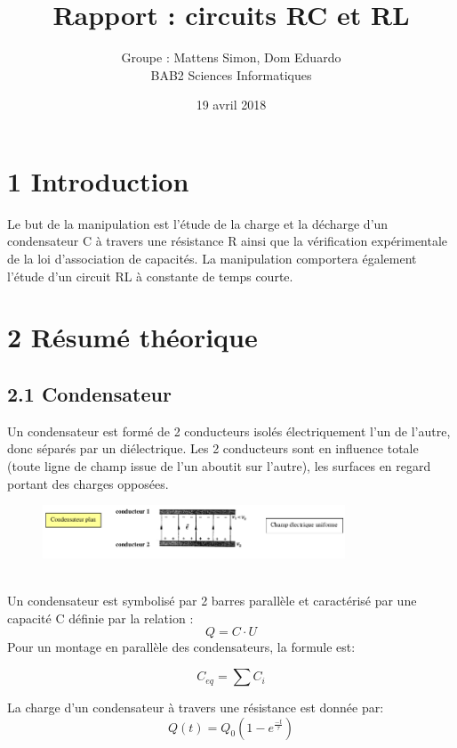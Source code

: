\documentclass{report}
\author{Groupe : Mattens Simon, Dom Eduardo\\ BAB2 Sciences Informatiques}
\title{Rapport : circuits RC et RL}
\date{19 avril 2018}
\makeatletter
\def\maketitle{%
  \null
  \thispagestyle{empty}%
  \vfill
  \begin{center}\leavevmode
    \normalfont
    {\LARGE \@title\par}%
    \vskip 1cm
    {\Large \@author\par}%
    \vskip 1cm
    {\Large \@date\par}%
  \end{center}%
  \vfill
  \null
  \newpage
  }
\makeatother
\begin{document}
\maketitle

\section*{1 Introduction}
\hspace*{0.5cm}
Le but de la manipulation est l'étude de la charge et la décharge d’un
condensateur C à travers une  résistance  R  ainsi  que  la  vérification expérimentale  de  la  loi d'association  de  capacités. 
La manipulation comportera également l’étude d’un circuit RL à constante de temps courte.

\section*{2 R\'esum\'e th\'eorique}
\subsection*{2.1 Condensateur}
\hspace*{0.5cm}
Un condensateur est formé de 2 conducteurs isolés électriquement l'un de l'autre, donc séparés par un diélectrique. Les 2 conducteurs sont en influence totale (toute ligne de champ issue de l'un aboutit sur l'autre), les surfaces en regard portant des charges opposées.
\begin{figure}[ht!]
\centering
\includegraphics[width=90mm]{cond.png}
\label{overflow}
\end{figure}
\\
Un condensateur est symbolisé par 2 barres parallèle et caractérisé par une capacité C définie par la relation  : 
\begin{equation}
    Q = C\cdot U
\end{equation}
Pour un montage en parall\`ele des condensateurs, la formule est:

\begin{equation}
    C_{eq} =\sum{C_{i}}
\end{equation}

La charge d'un condensateur \`a travers une r\'esistance est donn\'ee par:
\begin{equation}
    Q(t) = Q_{0}(1-e^{\frac{-t}{\tau}})
\end{equation}
\end{document}

